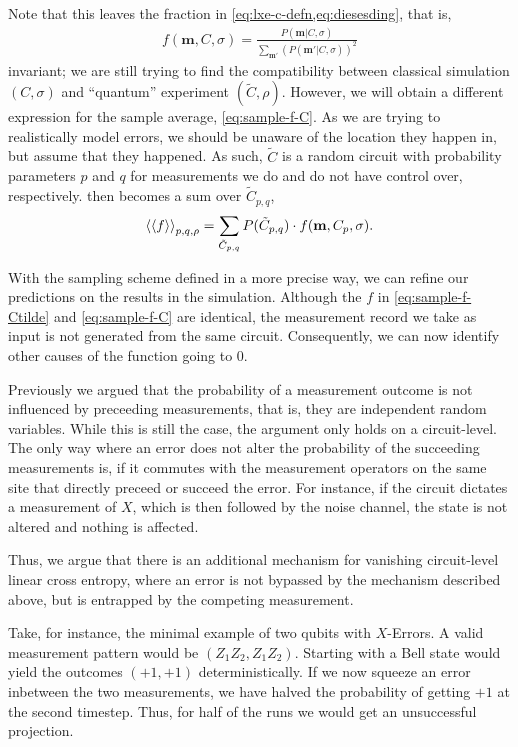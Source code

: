 Note that this leaves the fraction in \cref{eq:lxe-c-defn,eq:diesesding}, that
is,
\begin{align}
      f(\mathbf{m}, C, \sigma) = \frac{P(\mathbf{m} |
     C,\sigma)}{\sum_{\mathbf{m'}}\left(P(\mathbf{m}'|C,\sigma)\right)^2}
\end{align}
invariant;
we are still trying to find the compatibility
between classical simulation $(C, \sigma)$ and \enquote{quantum} experiment
$(\tilde{C}, \rho)$.  However, we will obtain a different expression for the
sample average, \cref{eq:sample-f-C}. As we are trying to realistically
model errors, we should be unaware of the location they happen in, but assume
that they happened. As such, $\tilde{C}$ is a random circuit with probability
parameters $p$ and $q$ for measurements we do and do not have control over, respectively.
 then becomes a sum over $\tilde{C}_{p,q}$,
\begin{align}
  \label{eq:sample-f-Ctilde} \expval{\expval{f}}_{p,q,\rho} =
\sum_{\tilde{C}_{p,q}} P(\tilde{C}_{p,q}) \cdot f(\mathbf{m},C_p, \sigma)
.\end{align}

With the sampling scheme defined in a more precise way, we can refine our
predictions on the results in the simulation. Although the $f$ in
\cref{eq:sample-f-Ctilde} and \cref{eq:sample-f-C} are identical, the
measurement record we take as input is not generated from the same circuit.
Consequently, we can now identify other causes of the function going to $0$.

Previously we argued that the probability of a
measurement outcome is not influenced by preceeding measurements, that is, they
are independent random variables. While this is still the case, the argument
only holds on a circuit-level. The only way where an error does not alter the
probability of the succeeding measurements is, if it commutes with the
measurement operators on the same site that directly preceed or succeed the
error. For instance, if the circuit dictates a measurement of $X$, which is
then followed by the noise channel, the state is not altered and nothing is
affected.

Thus, we argue that there is an additional mechanism for vanishing
circuit-level linear cross entropy, where an error is not bypassed by the
mechanism described above, but is entrapped by the competing measurement.

Take, for instance, the minimal example of two qubits with $X$-Errors.
A valid measurement pattern would be $(Z_1Z_2, Z_1Z_2)$. Starting with a
Bell state would yield the outcomes $(+1, +1)$ deterministically. If
we now squeeze an error inbetween the two measurements, we have halved the
probability of getting $+1$ at the second timestep. Thus, for half of the runs
we would get an unsuccessful projection. 

